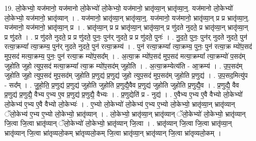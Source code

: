 \documentclass[17pt]{extarticle}
\begin{document}
19. लो॒केभ्यो॒ यज॑मानो॒ यज॑मानो लो॒केभ्यो॑ लो॒केभ्यो॒ यज॑मानो॒ भ्रातृ॑व्या॒न् भ्रातृ॑व्या॒न्॒. यज॑मानो लो॒केभ्यो॑ लो॒केभ्यो॒ यज॑मानो॒ भ्रातृ॑व्यान् । . यज॑मानो॒ भ्रातृ॑व्या॒न् भ्रातृ॑व्या॒न्॒. यज॑मानो॒ यज॑मानो॒ भ्रातृ॑व्या॒न् प्र प्र भ्रातृ॑व्या॒न्॒. यज॑मानो॒ यज॑मानो॒ भ्रातृ॑व्या॒न् प्र । . भ्रातृ॑व्या॒न् प्र प्र भ्रातृ॑व्या॒न् भ्रातृ॑व्या॒न् प्र णु॑दते नुदते॒ प्र भ्रातृ॑व्या॒न् भ्रातृ॑व्या॒न् प्र णु॑दते । . प्र णु॑दते नुदते॒ प्र प्र णु॑दते॒ पुनः॒ पुन॑र् नुदते॒ प्र प्र णु॑दते॒ पुनः॑ । . नु॒द॒ते॒ पुनः॒ पुन॑र् नुदते नुदते॒ पुन॑ रत्या॒क्रम्या᳚ त्या॒क्रम्य॒ पुन॑र् नुदते नुदते॒ पुन॑ रत्या॒क्रम्य॑ । . पुन॑ रत्या॒क्रम्या᳚ त्या॒क्रम्य॒ पुनः॒ पुन॑ रत्या॒क्र म्यो॑प॒सद॑ मुप॒सद॑ मत्या॒क्रम्य॒ पुनः॒ पुन॑ रत्या॒क्र म्यो॑प॒सद᳚म् । . अ॒त्या॒क्र म्यो॑प॒सद॑ मुप॒सद॑ मत्या॒क्रम्या᳚ त्या॒क्रम्यो॑ प॒सद॑म् जुहोति जुहो त्युप॒सद॑ मत्या॒क्रम्या᳚ त्या॒क्र म्यो॑प॒सद॑म् जुहोति । . अ॒त्या॒क्रम्येत्य॑ति - आ॒क्रम्य॑ । . उ॒प॒सद॑म् जुहोति जुहो त्युप॒सद॑ मुप॒सद॑म् जुहोति प्र॒णुद्य॑ प्र॒णुद्य॑ जुहो त्युप॒सद॑ मुप॒सद॑म् जुहोति प्र॒णुद्य॑ । . उ॒प॒सद॒मित्यु॑प - सद᳚म् । . जु॒हो॒ति॒ प्र॒णुद्य॑ प्र॒णुद्य॑ जुहोति जुहोति प्र॒णुद्यै॒वैव प्र॒णुद्य॑ जुहोति जुहोति प्र॒णुद्यै॒व । . प्र॒णुद्यै॒ वैव प्र॒णुद्य॑ प्र॒णुद्यै॒ वैभ्य ए॒भ्य ए॒व प्र॒णुद्य॑ प्र॒णुद्यै॒ वैभ्यः । . प्र॒णुद्येति॑ प्र - नुद्य॑ । . ए॒वैभ्य ए॒भ्य ए॒वै वैभ्यो लो॒केभ्यो॑ लो॒केभ्य॑ ए॒भ्य ए॒वै वैभ्यो लो॒केभ्यः॑ । . ए॒भ्यो लो॒केभ्यो॑ लो॒केभ्य॑ ए॒भ्य ए॒भ्यो लो॒केभ्यो॒ भ्रातृ॑व्या॒न् भ्रातृ॑व्यान् ॅलो॒केभ्य॑ ए॒भ्य ए॒भ्यो लो॒केभ्यो॒ भ्रातृ॑व्यान् । . लो॒केभ्यो॒ भ्रातृ॑व्या॒न् भ्रातृ॑व्यान् ॅलो॒केभ्यो॑ लो॒केभ्यो॒ भ्रातृ॑व्यान् जि॒त्वा जि॒त्वा भ्रातृ॑व्यान् ॅलो॒केभ्यो॑ लो॒केभ्यो॒ भ्रातृ॑व्यान् जि॒त्वा । . भ्रातृ॑व्यान् जि॒त्वा जि॒त्वा भ्रातृ॑व्या॒न् भ्रातृ॑व्यान् जि॒त्वा भ्रा॑तृव्यलो॒कम् भ्रा॑तृव्यलो॒कम् जि॒त्वा भ्रातृ॑व्या॒न् भ्रातृ॑व्यान् जि॒त्वा भ्रा॑तृव्यलो॒कम् । \newline
\end{document}
